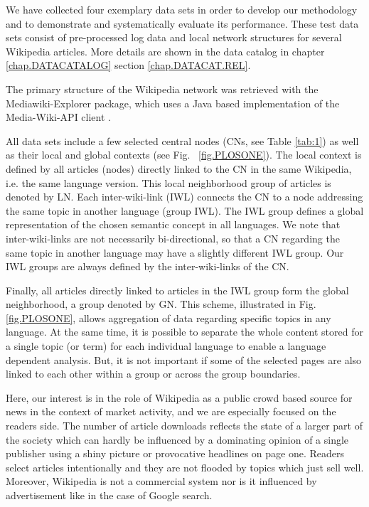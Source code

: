 \documentclass[a4paper,10pt]{scrbook}
\begin{document}
We have collected four exemplary data sets in order to develop our methodology
and to demonstrate and systematically evaluate its performance. These test data
sets consist of pre-processed log data and local network structures for several
Wikipedia articles. More details are shown in the data catalog in chapter \ref{chap.DATACATALOG} section \ref{chap.DATACAT.REL}.

The primary structure of the Wikipedia network was retrieved with the
Mediawiki-Explorer package, which uses a Java based implementation of the
Media-Wiki-API client \cite{WikiAPI}. 

All data sets include a few selected central nodes (CNs, see Table \ref{tab:1}) as well as 
their local and global contexts (see Fig.~ \ref{fig.PLOSONE}). The local context is defined by all articles (nodes) directly linked to the CN in the same Wikipedia, i.e. the same 
language version. This local neighborhood group of articles is denoted by LN. 
Each inter-wiki-link (IWL) connects the CN to a node addressing the same topic 
in another language (group IWL). The IWL group defines a global representation 
of the chosen semantic concept in all languages. We note that inter-wiki-links
are not necessarily bi-directional, so that a CN regarding the same topic in 
another language may have a slightly different IWL group. Our IWL groups are 
always defined by the inter-wiki-links of the CN.

Finally, all articles directly 
linked to articles in the IWL group form the global neighborhood, a group denoted 
by GN. This scheme, illustrated in Fig. \ref{fig.PLOSONE}, allows aggregation of data regarding
specific topics in any language. At the same time, it is possible to separate the 
whole content stored for a single topic (or term) for each individual language to 
enable a language dependent analysis. But, it is not important if some of the 
selected pages are also linked to each other within a group or across the group 
boundaries. 


Here, our interest is in the role of Wikipedia as a public crowd based source for news in the context of market activity, and we are especially focused on the readers side. The number of article downloads reflects the state of a larger part of the society which can hardly be influenced by a dominating opinion of a single publisher using a shiny picture or provocative headlines on page one. Readers select articles intentionally and they are not flooded by topics which just sell well. Moreover, Wikipedia is not a commercial system nor is it influenced by advertisement like in the case of Google search.   
\end{document}
